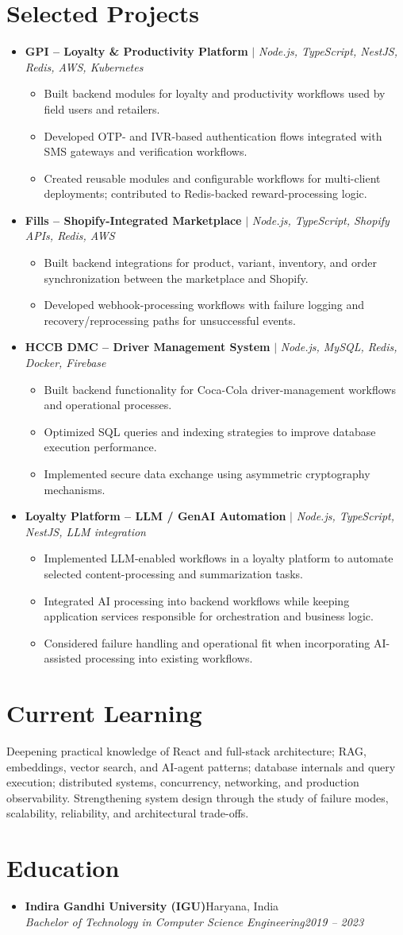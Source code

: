 \documentclass[letterpaper,10pt]{article}
\newcommand{\itemx}[1]{\item\small{#1\vspace{-2pt}}}
\newcommand{\subheading}[4]{\item \textbf{#1}\hfill #2\\\textit{\small #3}\hfill\textit{\small #4}\vspace{-5pt}}
\newcommand{\project}[2]{\item \small{\textbf{#1} $|$ \emph{#2}}\vspace{-5pt}}
\begin{document}
\section{Selected Projects}
\begin{itemize}[leftmargin=.15in,label={}]
\project{GPI -- Loyalty \& Productivity Platform}{Node.js, TypeScript, NestJS, Redis, AWS, Kubernetes}
\begin{itemize}[leftmargin=.18in]
\itemx{Built backend modules for loyalty and productivity workflows used by field users and retailers.}
\itemx{Developed OTP- and IVR-based authentication flows integrated with SMS gateways and verification workflows.}
\itemx{Created reusable modules and configurable workflows for multi-client deployments; contributed to Redis-backed reward-processing logic.}
\end{itemize}
\project{Fills -- Shopify-Integrated Marketplace}{Node.js, TypeScript, Shopify APIs, Redis, AWS}
\begin{itemize}[leftmargin=.18in]
\itemx{Built backend integrations for product, variant, inventory, and order synchronization between the marketplace and Shopify.}
\itemx{Developed webhook-processing workflows with failure logging and recovery/reprocessing paths for unsuccessful events.}
\end{itemize}
\project{HCCB DMC -- Driver Management System}{Node.js, MySQL, Redis, Docker, Firebase}
\begin{itemize}[leftmargin=.18in]
\itemx{Built backend functionality for Coca-Cola driver-management workflows and operational processes.}
\itemx{Optimized SQL queries and indexing strategies to improve database execution performance.}
\itemx{Implemented secure data exchange using asymmetric cryptography mechanisms.}
\end{itemize}
\project{Loyalty Platform -- LLM / GenAI Automation}{Node.js, TypeScript, NestJS, LLM integration}
\begin{itemize}[leftmargin=.18in]
\itemx{Implemented LLM-enabled workflows in a loyalty platform to automate selected content-processing and summarization tasks.}
\itemx{Integrated AI processing into backend workflows while keeping application services responsible for orchestration and business logic.}
\itemx{Considered failure handling and operational fit when incorporating AI-assisted processing into existing workflows.}
\end{itemize}
\end{itemize}

\section{Current Learning}
\small{Deepening practical knowledge of React and full-stack architecture; RAG, embeddings, vector search, and AI-agent patterns; database internals and query execution; distributed systems, concurrency, networking, and production observability. Strengthening system design through the study of failure modes, scalability, reliability, and architectural trade-offs.}

\section{Education}
\begin{itemize}[leftmargin=.15in,label={}]
\subheading{Indira Gandhi University (IGU)}{Haryana, India}{Bachelor of Technology in Computer Science Engineering}{2019 -- 2023}
\end{itemize}
\end{document}
